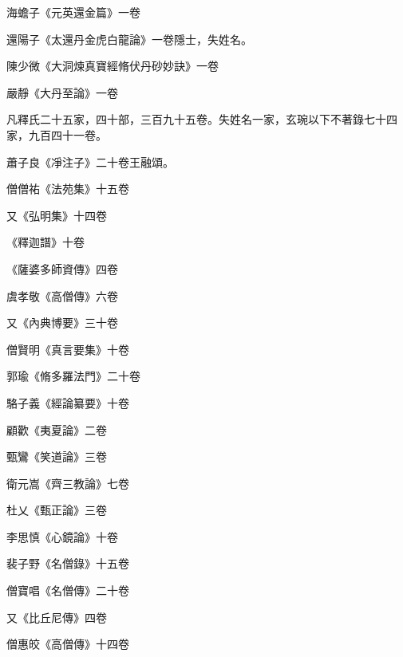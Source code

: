\begin{pinyinscope}
 海蟾子《元英還金篇》一卷



 還陽子《太還丹金虎白龍論》一卷隱士，失姓名。



 陳少微《大洞煉真寶經脩伏丹砂妙訣》一卷



 嚴靜《大丹至論》一卷



 凡釋氏二十五家，四十部，三百九十五卷。失姓名一家，玄琬以下不著錄七十四家，九百四十一卷。



 蕭子良《凈注子》二十卷王融頌。



 僧僧祐《法苑集》十五卷



 又《弘明集》十四卷



 《釋迦譜》十卷



 《薩婆多師資傳》四卷



 虞孝敬《高僧傳》六卷



 又《內典博要》三十卷



 僧賢明《真言要集》十卷



 郭瑜《脩多羅法門》二十卷



 駱子義《經論纂要》十卷



 顧歡《夷夏論》二卷



 甄鸞《笑道論》三卷



 衛元嵩《齊三教論》七卷



 杜乂《甄正論》三卷



 李思慎《心鏡論》十卷



 裴子野《名僧錄》十五卷



 僧寶唱《名僧傳》二十卷



 又《比丘尼傳》四卷



 僧惠皎《高僧傳》十四卷




\end{pinyinscope}
